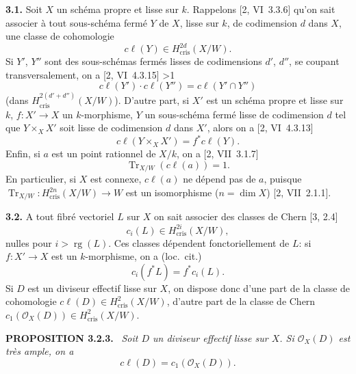 \documentclass[10pt]{article}
\makeatletter
\DeclareMathOperator{\Tr}{Tr}
\DeclareMathOperator{\rg}{rg}
\newcommand{\cris}{\mathrm{cris}}
\newcommand{\sourceanchor}[2]{\begingroup\def\@currentlabel{#2}\label{#1}\endgroup}
\newenvironment{sourcestatement}[3]{\par\smallskip\noindent\textbf{#1 #2.}\sourceanchor{#3}{#2}\ \itshape}{\par\normalfont\smallskip}
\newcommand{\DPage}[2]{\ifnum#1>1\clearpage\fi\setcounter{page}{#2}}
\makeatother
\begin{document}
\noindent\textbf{3.1.}
Soit $X$ un schéma propre et lisse sur $k$. Rappelons [2, VI~3.3.6] qu'on sait associer à tout sous-schéma fermé $Y$ de $X$, lisse sur $k$, de codimension $d$ dans $X$, une classe de cohomologie
\begin{equation}\tag{3.1.1}\label{eq:3.1.1}
c\ell(Y) \in H^{2d}_{\cris}(X/W).
\end{equation}
Si $Y'$, $Y''$ sont des sous-schémas fermés lisses de codimensions $d'$, $d''$, se coupant transversalement, on a [2, VI~4.3.15]
\DPage{19}{76}
\begin{equation}\tag{3.1.2}\label{eq:3.1.2}
c\ell(Y') \cdot c\ell(Y'') = c\ell(Y' \cap Y'')
\end{equation}
(dans $H^{2(d'+d'')}_{\cris}(X/W)$). D'autre part, si $X'$ est un schéma propre et lisse sur $k$, $f: X' \to X$ un $k$-morphisme, $Y$ un sous-schéma fermé lisse de codimension $d$ tel que $Y \times_X X'$ soit lisse de codimension $d$ dans $X'$, alors on a [2, VI~4.3.13]
\begin{equation}\tag{3.1.3}\label{eq:3.1.3}
c\ell(Y \times_X X') = f^* c\ell(Y).
\end{equation}
Enfin, si $a$ est un point rationnel de $X/k$, on a [2, VII~3.1.7]
\begin{equation}\tag{3.1.4}\label{eq:3.1.4}
\Tr_{X/W}(c\ell(a)) = 1.
\end{equation}
En particulier, si $X$ est connexe, $c\ell(a)$ ne dépend pas de $a$, puisque $\Tr_{X/W}: H^{2n}_{\cris}(X/W) \to W$ est un isomorphisme ($n = \dim X$) [2, VII~2.1.1].

\noindent\textbf{3.2.}
A tout fibré vectoriel $L$ sur $X$ on sait associer des classes de Chern [3, 2.4]
\begin{equation}\tag{3.2.1}\label{eq:3.2.1}
c_i(L) \in H^{2i}_{\cris}(X/W),
\end{equation}
nulles pour $i > \rg(L)$. Ces classes dépendent fonctoriellement de $L$: si $f: X' \to X$ est un $k$-morphisme, on a (loc.~cit.)
\begin{equation}\tag{3.2.2}\label{eq:3.2.2}
c_i(f^* L) = f^* c_i(L).
\end{equation}
Si $D$ est un diviseur effectif lisse sur $X$, on dispose donc d'une part de la classe de cohomologie $c\ell(D) \in H^2_{\cris}(X/W)$, d'autre part de la classe de Chern $c_1(\mathcal{O}_X(D)) \in H^2_{\cris}(X/W)$.

\begin{sourcestatement}{PROPOSITION}{3.2.3}{prop:3.2.3}
Soit $D$ un diviseur effectif lisse sur $X$. Si $\mathcal{O}_X(D)$ est très ample, on a
\begin{equation}\tag{3.2.3.1}\label{eq:3.2.3.1}
c\ell(D) = c_1(\mathcal{O}_X(D)).
\end{equation}
\end{sourcestatement}
\end{document}
